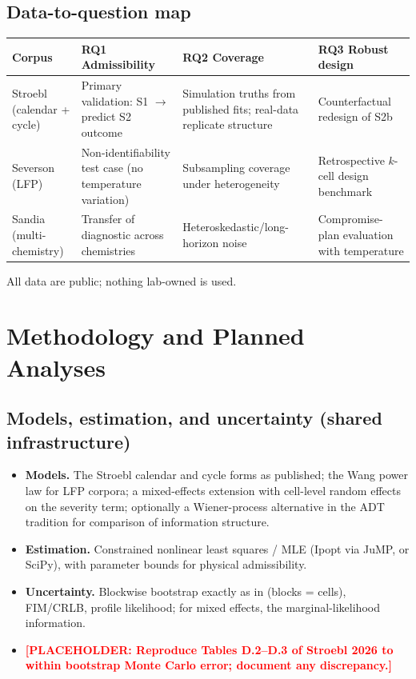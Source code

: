 \documentclass[11pt,letterpaper]{article}
\newcommand{\ph}[1]{\textcolor{red}{\textbf{[PLACEHOLDER: #1]}}}
\newcommand{\RQ}[1]{\textbf{RQ#1}}
\begin{document}
\subsection{Data-to-question map}
\begin{tabularx}{\textwidth}{@{}p{3.4cm} L L L@{}}
\toprule
\textbf{Corpus} & \RQ{1} Admissibility & \RQ{2} Coverage & \RQ{3} Robust design \\
\midrule
Stroebl (calendar + cycle) & Primary validation: S1 $\to$ predict S2 outcome & Simulation truths from published fits; real-data replicate structure & Counterfactual redesign of S2b \\
Severson (LFP) & Non-identifiability test case (no temperature variation) & Subsampling coverage under heterogeneity & Retrospective $k$-cell design benchmark \\
Sandia (multi-chemistry) & Transfer of diagnostic across chemistries & Heteroskedastic/long-horizon noise & Compromise-plan evaluation with temperature \\
\bottomrule
\end{tabularx}

All data are public; nothing lab-owned is used.

\section{Methodology and Planned Analyses}\label{sec:method}

\subsection{Models, estimation, and uncertainty (shared infrastructure)}
\begin{itemize}
  \item \textbf{Models.} The Stroebl calendar and cycle forms \cite{stroebl2026} as published; the Wang power law \cite{wang2011} for LFP corpora; a mixed-effects extension with cell-level random effects on the severity term; optionally a Wiener-process alternative in the ADT tradition \cite{limyum2011} for comparison of information structure.
  \item \textbf{Estimation.} Constrained nonlinear least squares / MLE (Ipopt via JuMP, or SciPy), with parameter bounds for physical admissibility.
  \item \textbf{Uncertainty.} Blockwise bootstrap exactly as in \cite{stroebl2026} (blocks = cells), FIM/CRLB, profile likelihood; for mixed effects, the marginal-likelihood information.
  \item \ph{Reproduce Tables D.2--D.3 of Stroebl 2026 to within bootstrap Monte Carlo error; document any discrepancy.}
\end{itemize}
\end{document}
